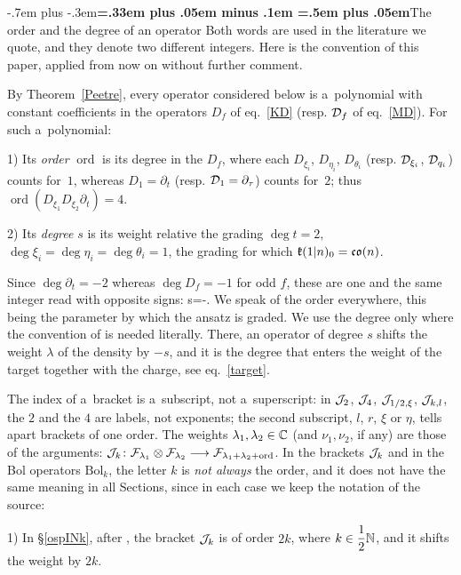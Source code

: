 \documentclass[12pt,a4paper]{amsart}
\makeatletter
\providecommand{\headspaces}{\spaceskip=.33em plus .05em minus .1em \xspaceskip=.5em plus .05em}
\def\subsection{\@startsection{subsection}{2}{0pt}{-1ex \@plus -.4ex \@minus -.2ex}%
  {-.7em plus -.3em}{\normalfont\normalsize\bfseries\boldmath\headspaces}}
\theoremstyle{thm}
\theoremstyle{definition}
\let\ssec\subsection
\newcommand {\tp}{\otimes}
\newcommand {\Bol}{\mathrm{Bol}}
\newcommand {\Nord}{\operatorname{ord}}   %
\makeatother
\begin{document}
\ssec{The order and the degree of an operator}\label{orderdeg}
Both words are used in the literature we quote, and they denote two different integers. Here
is the convention of this paper, applied from now on without further comment.

By Theorem~\ref{Peetre}, every operator considered below is a~polynomial with constant
coefficients in the operators $D_f$ of eq.~\eqref{KD} \textup{(}resp. ${\mathcal D}_f$ of
eq.~\eqref{MD}\textup{)}. For such a~polynomial:

1) Its \textit{order} $\Nord$ is its degree in the $D_f$, where each $D_{\xi_i}$,
$D_{\eta_i}$, $D_{\theta_i}$ \textup{(}resp. ${\mathcal D}_{\xi_i}$, ${\mathcal D}_{q_i}$\textup{)} counts
for~$1$, whereas $D_1=\partial_t$ \textup{(}resp. ${\mathcal D}_1=\partial_\tau$\textup{)} counts
for~$2$; thus $\Nord(D_{\xi_1}D_{\xi_2}\partial_t)=4$.

2) Its \textit{degree} $s$ is its weight relative the grading $\deg t=2$,
$\deg\xi_i=\deg\eta_i=\deg\theta_i=1$, the grading for which ${\mathfrak{k}}(1|n)_0={\mathfrak{c}}{\mathfrak{o}}(n)$.

Since $\deg\partial_t=-2$ whereas $\deg D_f=-1$ for odd $f$, these are one and the same
integer read with opposite signs:
\be\label{ords}
s=-\Nord .
\ee
We speak of the order everywhere, this being the parameter by which the ansatz is graded. We
use the degree only where the convention of \cite{BLS1} is needed literally. There, an operator
of degree $s$ shifts the weight $\lambda$ of the density by $-s$, and it is the degree that
enters the weight of the target together with the charge, see eq.~\eqref{target}.

\label{indexk} The index of a~bracket is a~subscript, not
a~superscript\textup{:} in ${\mathcal J}_2$, ${\mathcal J}_4$, ${\mathcal J}_{1/2,\xi}$, ${\mathcal J}_{k,l}$, the $2$ and the $4$ are labels,
not exponents\textup{;} the second subscript, $l$, $r$, $\xi$ or $\eta$, tells apart brackets of
one order. The weights $\lambda_1,\lambda_2\in{\mathbb C}$ \textup{(}and $\nu_1,\nu_2$, if any\textup{)} are those
of the arguments\textup{:} $\cJ_k\colon\cF_{\lambda_1}\tp\cF_{\lambda_2}\tto\cF_{\lambda_1+\lambda_2+\Nord}$.
In the brackets ${\mathcal J}_k$ and in the Bol operators $\Bol_k$, the letter $k$ is \textit{not always} the order, and it does not have the same
meaning in all Sections, since in each case we keep the notation of the source:

1) In \S\ref{ospINk}, after \cite{GO, Om}, the bracket ${\mathcal J}_k$ is of order $2k$, where
$k\in\nfrac12\Nee$, and it shifts the weight by $2k$.
\end{document}
